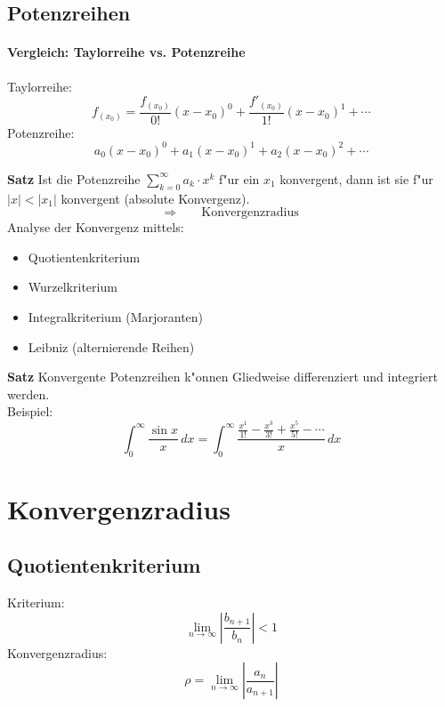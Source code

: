 \subsection{Potenzreihen}
\paragraph{Vergleich: Taylorreihe vs. Potenzreihe}
Taylorreihe:
\begin{equation}
  f_{(x_0)} = \frac{f_{(x_0)}}{0!}(x-x_0)^0 + \frac{f'_{(x_0)}}{1!}(x-x_0)^1 + \cdots
\end{equation}
Potenzreihe:
\begin{equation}
  a_0(x-x_0)^0 + a_1(x-x_0)^1 + a_2(x-x_0)^2 + \cdots
\end{equation}

\textbf{Satz}
Ist die Potenzreihe $\sum_{k=0}^\infty a_k\cdot x^k$ f"ur ein $x_1$
konvergent, dann ist sie f"ur $|x| < |x_1|$ konvergent (absolute Konvergenz).
\begin{equation*}
\Longrightarrow\qquad\text{Konvergenzradius}
\end{equation*}
Analyse der Konvergenz mittels:
\begin{itemize}
  \item Quotientenkriterium
  \item Wurzelkriterium
  \item Integralkriterium (Marjoranten)
  \item Leibniz (alternierende Reihen)
\end{itemize}

\textbf{Satz}
Konvergente Potenzreihen k"onnen Gliedweise differenziert und integriert werden. \\
Beispiel:
\begin{equation}
  \int_0^\infty\frac{\sin{x}}{x}\,dx = \int_0^\infty\frac{\frac{x^1}{1!}-\frac{x^3}{3!}+\frac{x^5}{5!}-\cdots}{x}\,dx
\end{equation}


\section{Konvergenzradius}
\subsection{Quotientenkriterium}
Kriterium:
\begin{equation}
  \lim_{n\rightarrow\infty}\left|{\frac{b_{n+1}}{b_n}}\right| < 1
\end{equation}
Konvergenzradius:
\begin{equation}
  \rho = \lim_{n\rightarrow\infty}\left|\frac{a_n}{a_{n+1}}\right|
\end{equation}

